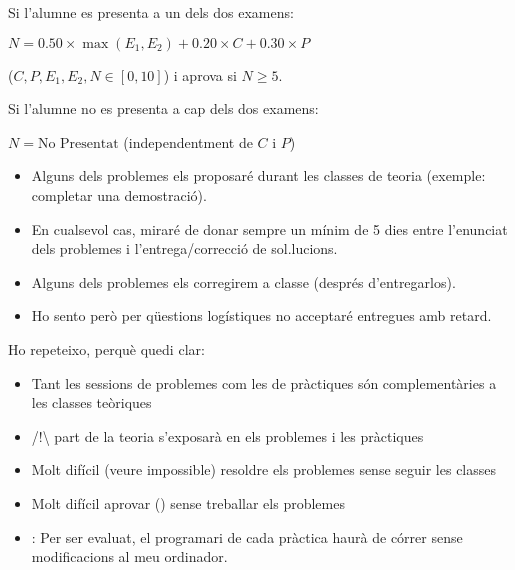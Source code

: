 \documentclass[letterpaper,10pt,english]{sphinxmanual}
\begin{document}
Si l’alumne es presenta a un dels dos examens:

\(N = 0.50 \times \max\left(E_1, E_2\right) + 0.20  \times C + 0.30 × P\)

(\(C, P, E_1, E_2, N \in \left[0, 10\right]\)) i aprova si \(N \geq 5\).

Si l’alumne no es presenta a cap dels dos examens:

\(N = \mbox{No Presentat}\) (independentment de \(C\) i \(P\))
\begin{itemize}
\item {} 
Alguns dels problemes els proposaré durant les classes de teoria (exemple: completar una demostració).

\item {} 
En cualsevol cas, miraré de donar sempre un mínim de 5 dies entre l’enunciat dels problemes i l’entrega/correcció de sol.lucions.

\item {} 
Alguns dels problemes els corregirem a classe (després d’entregar\sphinxhyphen{}los).

\item {} 
Ho sento però per qüestions logístiques no acceptaré entregues amb retard.

\end{itemize}

Ho repeteixo, perquè quedi clar:
\begin{itemize}
\item {} 
Tant les sessions de problemes com les de pràctiques són complementàries a les classes teòriques

\item {} 
/!\textbackslash{} part de la teoria s’exposarà en els problemes i les pràctiques

\item {} 
Molt difícil (veure impossible) resoldre els problemes sense seguir les classes

\item {} 
Molt difícil aprovar () sense treballar els problemes

\item {} 
: Per ser evaluat, el programari de cada pràctica haurà de córrer sense modificacions al meu ordinador.

\end{itemize}
\end{document}
